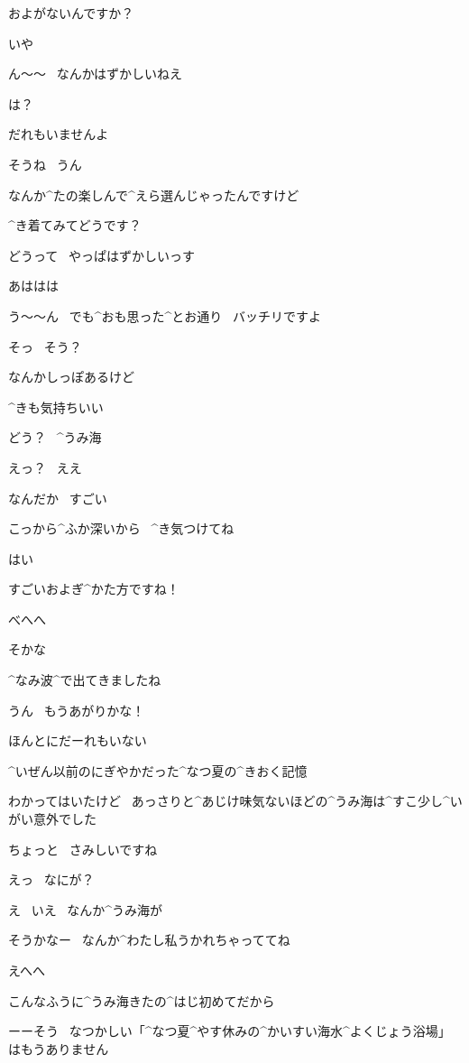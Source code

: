 \Kokone およがないんですか？

\Alpha いや

\Alpha ん〜〜
\ なんかはずかしいねえ

\Kokone は？

\Kokone だれもいませんよ

\Alpha そうね
\ うん

\page[25]
\Kokone なんか^{たの}{楽}しんで^{えら}{選}んじゃったんですけど

\Kokone ^{き}{着}てみてどうです？

\Alpha どうって
\ やっぱはずかしいっす

\Alpha あははは

\Kokone う〜〜ん
\ でも^{おも}{思}った^{とお}{通}り
\ バッチリですよ

\Alpha そっ
\ そう？

\Alpha なんかしっぽあるけど

\page[26]
\Kokone ^{きも}{気持}ちいい

\page[27]
\Alpha どう？
\ ^{うみ}{海}

\Kokone えっ？
\ ええ

\Kokone なんだか
\ すごい

\Alpha こっから^{ふか}{深}いから
\ ^{き}{気}つけてね

\Kokone はい

\page[30]
\Kokone すごいおよぎ^{かた}{方}ですね！

\Alpha べへへ

\Alpha そかな

\page[31]
\Kokone ^{なみ}{波}^{で}{出}てきましたね

\Alpha うん
\ もうあがりかな！

\Kokone ほんとにだーれもいない

\Kokone ^{いぜん}{以前}のにぎやかだった^{なつ}{夏}の^{きおく}{記憶}

\Kokone わかってはいたけど
\ あっさりと^{あじけ}{味気}ないほどの^{うみ}{海}は^{すこ}{少}し^{いがい}{意外}でした

\page[32]
\Kokone ちょっと
\ さみしいですね

\Alpha えっ
\ なにが？

\Kokone え
\ いえ
\ なんか^{うみ}{海}が

\Alpha そうかなー
\ なんか^{わたし}{私}うかれちゃっててね

\Alpha えへへ

\Alpha こんなふうに^{うみ}{海}きたの^{はじ}{初}めてだから

\page[33]
\Narrator ーーそう
\ なつかしい「^{なつ}{夏}^{やす}{休}みの^{かいすい}{海水}^{よくじょう}{浴場}」はもうありません

